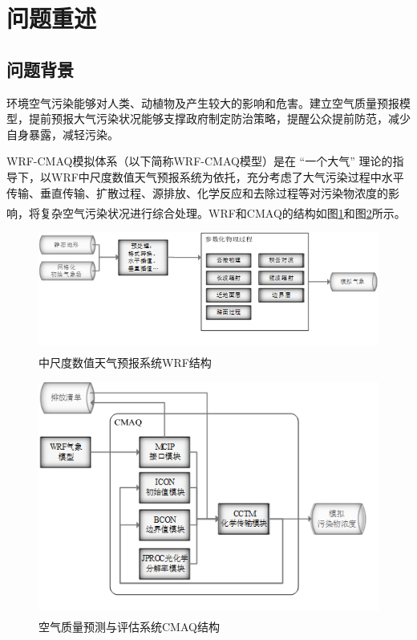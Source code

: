 \documentclass[bwprint]{gmcmthesis}
\numberwithin{figure}{section}
\newcommand{\upcite}[1]{\textsuperscript{\textsuperscript{\cite{#1}}}}
\begin{document}
\tableofcontents
\newpage

\section{问题重述}
\subsection{问题背景}
环境空气污染能够对人类、动植物及产生较大的影响和危害。建立空气质量预报模型，提前预报大气污染状况能够支撑政府制定防治策略，提醒公众提前防范，减少自身暴露，减轻污染。

WRF-CMAQ模拟体系（以下简称WRF-CMAQ模型）是在 “一个大气” 理论的指导下，以WRF中尺度数值天气预报系统为依托，充分考虑了大气污染过程中水平传输、垂直传输、扩散过程、源排放、化学反应和去除过程等对污染物浓度的影响，将复杂空气污染状况进行综合处理\upcite{ref1}。WRF和CMAQ的结构如图\ref{fig1-1}和图\ref{fig1-2}所示。
\begin{figure}[!h]
	\centering
	\includegraphics[width=.7\textwidth]{figures//fig1-1.png}
	\caption{中尺度数值天气预报系统WRF结构\upcite{ref2}}
	\label{fig1-1}
\end{figure}
\begin{figure}[!h]
	\centering
	\includegraphics[width=.7\textwidth]{figures//fig1-2.png}
	\caption{空气质量预测与评估系统CMAQ结构\upcite{ref3}}
	\label{fig1-2}
\end{figure}
\end{document}
